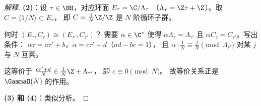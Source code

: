 \begin{proof}[解释]
\textbf{(2)}：设 $\tau \in \HH$，对应环面 $E_\tau = \C/\Lambda_\tau$
（$\Lambda_\tau = \Z\tau + \Z$）。取 $C = \langle 1/N \rangle \subset E_\tau$，
即 $C = \frac{1}{N}\Z/\Z$ 是 $N$ 阶循环子群。

何时 $(E_\tau, C_\tau) \cong (E_{\tau'}, C_{\tau'})$？
需要 $\alpha \in \C^*$ 使得 $\alpha\Lambda_\tau = \Lambda_{\tau'}$
且 $\alpha C_\tau = C_{\tau'}$。写出条件：
$\alpha\tau = a\tau' + b$，$\alpha = c\tau' + d$（$ad - bc = 1$），
且 $\alpha \cdot \frac{1}{N} \equiv \frac{j}{N} \pmod{\Lambda_{\tau'}}$
对某 $j$ 与 $N$ 互素。

这等价于 $\frac{c\tau' + d}{N} \in \frac{1}{N}\Z + \Lambda_{\tau'}$，
即 $c \equiv 0 \pmod{N}$。
故等价关系正是 $\GammaO(N)$ 的作用。

\textbf{(3) 和 (4)}：类似分析。
\end{proof}


